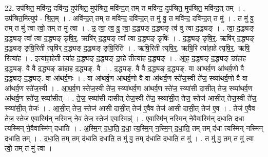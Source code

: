 \documentclass[17pt]{extarticle}
\begin{document}
22. उप॑श्रित॒ मवि॑न्द॒ दवि॑न्द॒ दुप॑श्रित॒ मुप॑श्रित॒ मवि॑न्द॒त् तम् त मवि॑न्द॒ दुप॑श्रित॒ मुप॑श्रित॒ मवि॑न्द॒त् तम् । . उप॑श्रित॒मित्युप॑ - श्रि॒त॒म् । . अवि॑न्द॒त् तम् त मवि॑न्द॒ दवि॑न्द॒त् त मु॑ वु॒ त मवि॑न्द॒ दवि॑न्द॒त् त मु॑ । . त मु॑ वु॒ तम् त मु॑ त्वा त्वो॒ तम् त मु॑ त्वा । . उ॒ त्वा॒ त्व॒ वु॒ त्वा॒ द॒द्ध्यङ् द॒द्ध्यङ् त्व॑ वु त्वा द॒द्ध्यङ् । . त्वा॒ द॒द्ध्यङ् द॒द्ध्यङ् त्वा᳚ त्वा द॒द्ध्यङ् ङृषि॒र्॒. ऋषि॑र् द॒द्ध्यङ् त्वा᳚ त्वा द॒द्ध्यङ् ङृषिः॑ । . द॒द्ध्यङ् ङृषि॒र्॒. ऋषि॑र् द॒द्ध्यङ् द॒द्ध्यङ् ङृषि॒रिती त्यृषि॑र् द॒द्ध्यङ् द॒द्ध्यङ् ङृषि॒रिति॑ । . ऋषि॒रिती त्यृषि॒र्॒. ऋषि॒रि त्या॑हा॒हे त्यृषि॒र्॒. ऋषि॒ रित्या॑ह । . इत्या॑हा॒हेती त्या॑ह द॒द्ध्यङ् द॒द्ध्यङ् ङा॒हे तीत्या॑ह द॒द्ध्यङ् । . आ॒ह॒ द॒द्ध्यङ् द॒द्ध्यङ् ङा॑हाह द॒द्ध्यङ्. वै वै द॒द्ध्यङ् ङा॑हाह द॒द्ध्यङ्. वै । . द॒द्ध्यङ्. वै वै द॒द्ध्यङ् द॒द्ध्यङ्. वा आ॑थर्व॒ण आ॑थर्व॒णो वै द॒द्ध्यङ् द॒द्ध्यङ्. वा आ॑थर्व॒णः । . वा आ॑थर्व॒ण आ॑थर्व॒णो वै वा आ॑थर्व॒ण स्ते॑ज॒स्वी ते॑ज॒ स्व्या॑थर्व॒णो वै वा आ॑थर्व॒ण स्ते॑ज॒स्वी । . आ॒थ॒र्व॒ण स्ते॑ज॒स्वी ते॑ज॒ स्व्या॑थर्व॒ण आ॑थर्व॒ण स्ते॑ज॒ स्व्या॑सी दासीत् तेज॒ स्व्या॑थर्व॒ण आ॑थर्व॒ण स्ते॑ज॒ स्व्या॑सीत् । . ते॒ज॒ स्व्या॑सी दासीत् तेज॒स्वी ते॑ज॒ स्व्या॑सी॒त् तेज॒ स्तेज॑ आसीत् तेज॒स्वी ते॑ज॒ स्व्या॑सी॒त् तेजः॑ । . आ॒सी॒त् तेज॒ स्तेज॑ आसी दासी॒त् तेज॑ ए॒वैव तेज॑ आसी दासी॒त् तेज॑ ए॒व । . तेज॑ ए॒वैव तेज॒ स्तेज॑ ए॒वास्मि॑न् नस्मिन् ने॒व तेज॒ स्तेज॑ ए॒वास्मिन्न्॑ । . ए॒वास्मि॑न् नस्मिन् ने॒वैवास्मि॑न् दधाति दधा त्यस्मिन् ने॒वैवास्मि॑न् दधाति । . अ॒स्मि॒न् द॒धा॒ति॒ द॒धा॒ त्य॒स्मि॒न् न॒स्मि॒न् द॒धा॒ति॒ तम् तम् द॑धा त्यस्मिन् नस्मिन् दधाति॒ तम् । . द॒धा॒ति॒ तम् तम् द॑धाति दधाति॒ त मु॑ वु॒ तम् द॑धाति दधाति॒ त मु॑ । . त मु॑ वु॒ तम् त मु॑ त्वा त्वो॒ तम् त मु॑ त्वा । \newline
\end{document}
